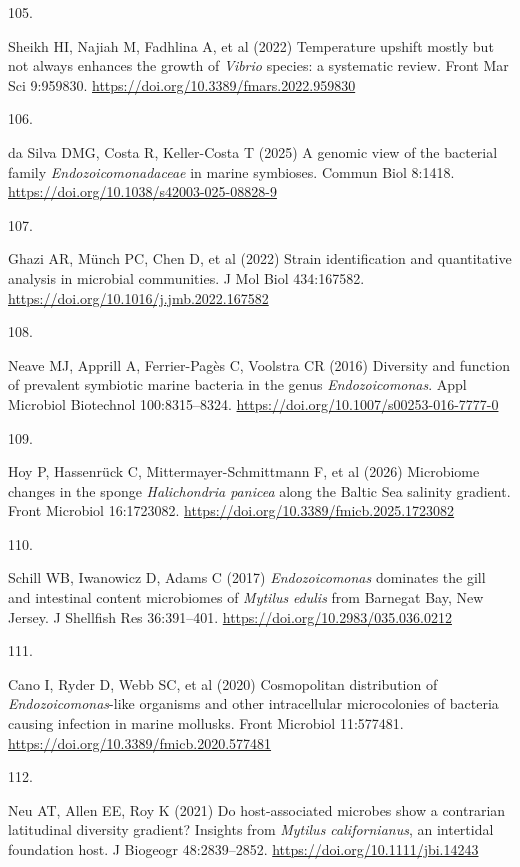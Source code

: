 \documentclass[
  12 pt,
]{article}
\newlength{\cslhangindent}
\newlength{\csllabelwidth}
\newenvironment{CSLReferences}[2] %
 {\begin{list}{}{%
  \setlength{\itemindent}{0pt}
  \setlength{\leftmargin}{0pt}
  \setlength{\parsep}{0pt}
  \ifodd #1
   \setlength{\leftmargin}{\cslhangindent}
   \setlength{\itemindent}{-1\cslhangindent}
  \fi
  \setlength{\itemsep}{#2\baselineskip}}}
 {\end{list}}
\newcommand{\CSLLeftMargin}[1]{\parbox[t]{\csllabelwidth}{\strut#1\strut}}
\newcommand{\CSLRightInline}[1]{\parbox[t]{\linewidth - \csllabelwidth}{\strut#1\strut}}
\begin{document}
\begin{CSLReferences}{0}{0}
\CSLLeftMargin{105. }%
\CSLRightInline{Sheikh HI, Najiah M, Fadhlina A, et al (2022) Temperature upshift mostly but not always enhances the growth of {{\emph{Vibrio}}} species: a systematic review. Front Mar Sci 9:959830. \url{https://doi.org/10.3389/fmars.2022.959830}}

\CSLLeftMargin{106. }%
\CSLRightInline{da Silva DMG, Costa R, Keller-Costa T (2025) A genomic view of the bacterial family {{\emph{Endozoicomonadaceae}}} in marine symbioses. Commun Biol 8:1418. \url{https://doi.org/10.1038/s42003-025-08828-9}}

\CSLLeftMargin{107. }%
\CSLRightInline{Ghazi AR, Münch PC, Chen D, et al (2022) Strain identification and quantitative analysis in microbial communities. J Mol Biol 434:167582. \url{https://doi.org/10.1016/j.jmb.2022.167582}}

\CSLLeftMargin{108. }%
\CSLRightInline{Neave MJ, Apprill A, Ferrier-Pagès C, Voolstra CR (2016) Diversity and function of prevalent symbiotic marine bacteria in the genus {\emph{Endozoicomonas}}. Appl Microbiol Biotechnol 100:8315--8324. \url{https://doi.org/10.1007/s00253-016-7777-0}}

\CSLLeftMargin{109. }%
\CSLRightInline{Hoy P, Hassenrück C, Mittermayer-Schmittmann F, et al (2026) Microbiome changes in the sponge {\emph{Halichondria panicea}} along the {Baltic Sea} salinity gradient. Front Microbiol 16:1723082. \url{https://doi.org/10.3389/fmicb.2025.1723082}}

\CSLLeftMargin{110. }%
\CSLRightInline{Schill WB, Iwanowicz D, Adams C (2017) {\emph{Endozoicomonas}} dominates the gill and intestinal content microbiomes of {{\emph{Mytilus}}}{\emph{ edulis}} from {Barnegat Bay}, {New Jersey}. J Shellfish Res 36:391--401. \url{https://doi.org/10.2983/035.036.0212}}

\CSLLeftMargin{111. }%
\CSLRightInline{Cano I, Ryder D, Webb SC, et al (2020) Cosmopolitan distribution of {\emph{Endozoicomonas}}-like organisms and other intracellular microcolonies of bacteria causing infection in marine mollusks. Front Microbiol 11:577481. \url{https://doi.org/10.3389/fmicb.2020.577481}}

\CSLLeftMargin{112. }%
\CSLRightInline{Neu AT, Allen EE, Roy K (2021) Do host-associated microbes show a contrarian latitudinal diversity gradient? Insights from {\emph{Mytilus californianus}}, an intertidal foundation host. J Biogeogr 48:2839--2852. \url{https://doi.org/10.1111/jbi.14243}}


\end{CSLReferences}
\end{document}
